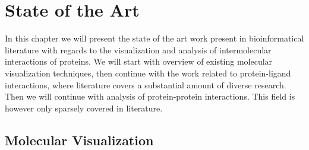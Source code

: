 \chapter{State of the Art}
\label{Sec:star}
In this chapter we will present the state of the art work present in bioinformatical literature with regards to the visualization and analysis of intermolecular interactions of proteins. We will start with overview of existing molecular visualization techniques, then continue with the work related to protein-ligand interactions, where literature covers a substantial amount of diverse research. Then we will continue with analysis of protein-protein interactions. This field is however only sparsely covered in literature.

\section{Molecular Visualization}
